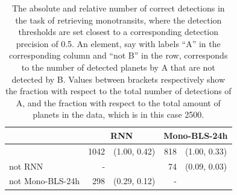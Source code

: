 \begin{table}[]
\label{tab:mono_AnotB}
\centering
\begin{tabular}{@{}lrlrl@{}}
\toprule
                 & \multicolumn{2}{c}{RNN} & \multicolumn{2}{c}{Mono-BLS-24h} \\ \midrule
                 & 1042   & (1.00, 0.42)   & 818        & (1.00, 0.33)        \\
not RNN          & -      &                & 74         & (0.09, 0.03)        \\
not Mono-BLS-24h & 298    & (0.29, 0.12)   & -          &                     \\ \bottomrule
\end{tabular}
\caption{The absolute and relative number of correct detections in the task of retrieving monotransits, where the detection thresholds are set closest to a corresponding detection precision of 0.5. An element, say with labels ``A'' in the corresponding column and ``not B'' in the row, corresponds to the number of detected planets by A that are not detected by B. Values between brackets respectively show the fraction with respect to the total number of detections of A, and the fraction with respect to the total amount of planets in the data, which is in this case 2500.}
\end{table}

